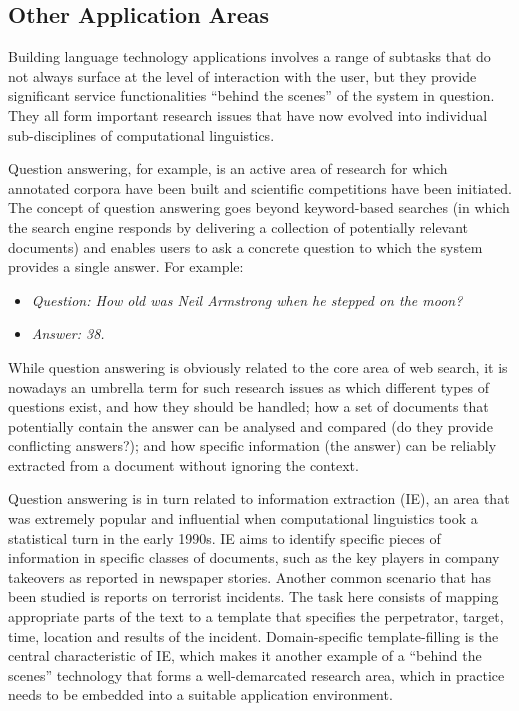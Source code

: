 \begin{multicols}{2}
 \subsection {Other Application Areas}

Building language technology applications involves a range of subtasks that do not always surface at the level of interaction with the user, but they provide significant service functionalities “behind the scenes” of the system in question. They all form important research issues that have now evolved into individual sub-disciplines of computational linguistics. 

Question answering, for example, is an active area of research for which annotated corpora have been built and scientific competitions have been initiated. The concept of question answering goes beyond keyword-based searches (in which the search engine responds by delivering a collection of potentially relevant documents) and enables users to ask a concrete question to which the system provides a single answer. For example:

\begin{itemize}
\item[] \textit{Question: How old was Neil Armstrong when he stepped on the moon?}
\item[] \textit{Answer: 38.}
\end{itemize}

While question answering is obviously related to the core area of web search, it is nowadays an umbrella term for such research issues as which different types of questions exist, and how they should be handled; how a set of documents that potentially contain the answer can be analysed and compared (do they provide conflicting answers?); and how specific information (the answer) can be reliably extracted from a document without ignoring the context.    


Question answering is in turn related to information extraction (IE), an area that was extremely popular and influential when computational linguistics took a statistical turn in the early 1990s. IE aims to identify specific pieces of information in specific classes of documents, such as the key players in company takeovers as reported in newspaper stories. Another common scenario that has been studied is reports on terrorist incidents. The task here consists of mapping appropriate parts of the text to a template that specifies the perpetrator, target, time, location and results of the incident. Domain-specific template-filling is the central characteristic of IE, which makes it another example of a “behind the scenes” technology that forms a well-demarcated research area, which in practice needs to be embedded into a suitable application environment.


\end{multicols}
